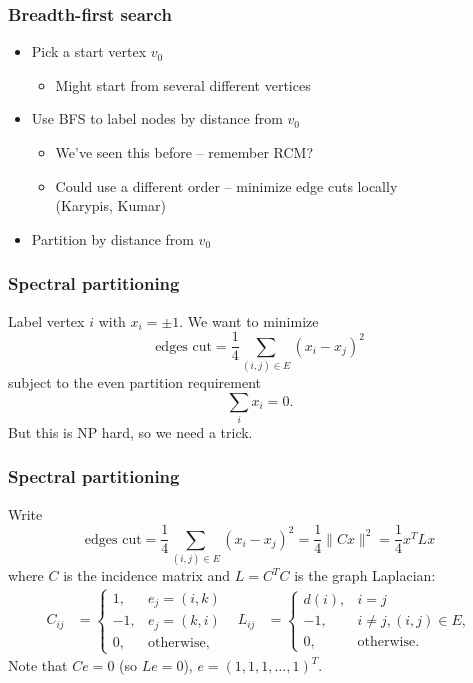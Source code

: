 \documentclass{beamer}
\begin{document}
\begin{frame}
  \frametitle{Breadth-first search}

  \begin{center}
    \begin{tikzpicture}[scale=0.7]
      
    \end{tikzpicture}
  \end{center}
  
  \begin{itemize}
  \item Pick a start vertex $v_0$
    \begin{itemize}
    \item Might start from several different vertices
    \end{itemize}
  \item Use BFS to label nodes by distance from $v_0$
    \begin{itemize}
    \item We've seen this before -- remember RCM?
    \item Could use a different order -- minimize edge cuts locally \\
      (Karypis, Kumar)
    \end{itemize}
  \item Partition by distance from $v_0$
  \end{itemize}
\end{frame}


\begin{frame}
  \frametitle{Spectral partitioning}

  Label vertex $i$ with $x_i = \pm 1$.  We want to minimize
  \[
    \mbox{edges cut} = \frac{1}{4} \sum_{(i,j) \in E} (x_i-x_j)^2
  \]
  subject to the even partition requirement
  \[
    \sum_i x_i = 0.
  \]
  But this is NP hard, so we need a trick.

\end{frame}


\begin{frame}
  \frametitle{Spectral partitioning}

  Write
  \[
    \mbox{edges cut} 
    = \frac{1}{4} \sum_{(i,j) \in E} (x_i-x_j)^2 
    = \frac{1}{4} \|Cx\|^2 = \frac{1}{4} x^T L x
  \]
  where $C$ is the incidence matrix and $L = C^T C$ is the graph Laplacian:
  \begin{align*}
    C_{ij} &= 
      \begin{cases}
         1, & e_j = (i,k) \\
        -1, & e_j = (k,i) \\
         0, & \mbox{otherwise},
      \end{cases} &
    L_{ij} &= 
    \begin{cases} 
      d(i), & i = j \\
      -1, & i \neq j, (i,j) \in E, \\ 
      0, & \mbox{otherwise}.
    \end{cases}
  \end{align*}
  Note that $C e = 0$ (so $L e = 0$), $e = (1, 1, 1, \ldots, 1)^T$.

\end{frame}
\end{document}
